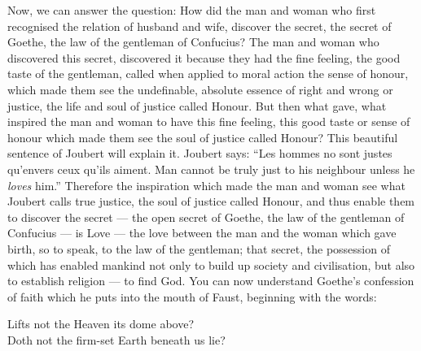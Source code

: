 Now, we can answer the question: How did the man and woman who first recognised the relation of husband and wife, discover the secret, the secret of Goethe, the law of the gentleman of Confucius?
The man and woman who discovered this secret, discovered it because they had the fine feeling, the good taste of the gentleman, called when applied to moral action the sense of honour, which made them see the undefinable, absolute essence of right and wrong or justice, the life and soul of justice called Honour.
But then what gave, what inspired the man and woman to have this fine feeling, this good taste or sense of honour which made them see the soul of justice called Honour?
This beautiful sentence of Joubert will explain it.
Joubert says: ``Les hommes no sont justes qu'envers ceux qu'ils aiment. Man cannot be truly just to his neighbour unless he \emph{loves} him.''
Therefore the inspiration which made the man and woman see what Joubert calls true justice, the soul of justice called Honour, and thus enable them to discover the secret --- the open secret of Goethe, the law of the gentleman of Confucius --- is Love --- the love between the man and the woman which gave birth, so to speak, to the law of the gentleman; that secret, the possession of which has enabled mankind not only to build up society and civilisation, but also to establish religion --- to find God.
You can now understand Goethe's confession of faith which he puts into the mouth of Faust, beginning with the words:
\begin{center}
    Lifts not the Heaven its dome above? \\
    Doth not the firm-set Earth beneath us lie?
\end{center}

